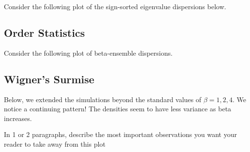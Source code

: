 Consider the following plot of the sign-sorted eigenvalue dispersions below.

\subsection{Order Statistics}

Consider the following plot of beta-ensemble dispersions.


\newpage
\subsection{Wigner's Surmise}


Below, we extended the simulations beyond the standard values of $\beta = 1,2,4$. We notice a continuing pattern! The densities seem to have less variance as
beta increases.




In 1 or 2 paragraphs, describe the most important observations you want your reader to take away from this plot
